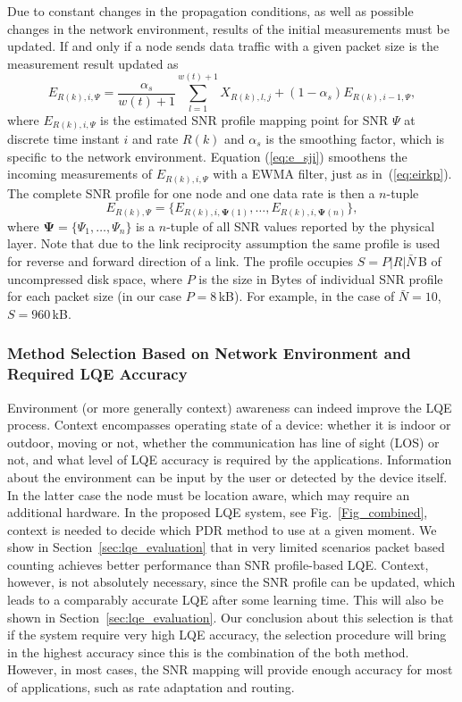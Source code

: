 \documentclass[11pt,draftclsnofoot,journal,onecolumn]{IEEEtran}
\begin{document}
Due to constant changes in the propagation conditions, as well as possible changes in the network environment, results of the initial measurements must be updated. If and only if a node sends data traffic with a given packet size is the measurement result updated as
\begin{equation}
E_{R(k),i,\Psi}=\frac{\alpha_s}{w(t)+1}\sum_{l=1}^{w(t)+1}X_{R(k),l,j}+(1-\alpha_s)E_{R(k),i-1,\Psi},
\label{eq:e_sji}
\end{equation}
where $E_{R(k),i,\Psi}$ is the estimated SNR profile mapping point for SNR $\Psi$ at discrete time instant $i$ and rate $R(k)$ and $\alpha_s$ is the smoothing factor, which is specific to the network environment. Equation (\ref{eq:e_sji}) smoothens the incoming measurements of $E_{R(k),i,\Psi}$ with a EWMA filter, just as in~(\ref{eq:eirkp}). The complete SNR profile for one node and one data rate is then a $n$-tuple
\begin{equation}
E_{R(k),\Psi}=\{E_{R(k),i,\mathbf\Psi(1)},\ldots,E_{R(k),i,\mathbf\Psi(n)}\},
\label{eq:eirks}
\end{equation}
where $\mathbf\Psi=\{\Psi_1,\ldots,\Psi_n\}$ is a $n$-tuple of all SNR values reported by the physical layer. Note that due to the link reciprocity assumption the same profile is used for reverse and forward direction of a link. The profile occupies $S=P|R|\bar{N}$\,B of uncompressed disk space, where $P$ is the size in Bytes of individual SNR profile for each packet size (in our case $P=8$\,kB). For example, in the case of $\bar N=10$, $S=960$\,kB.

\subsubsection{Method Selection Based on Network Environment and Required LQE Accuracy}
\label{sec:context}

Environment (or more generally context) awareness can indeed improve the LQE process. Context encompasses operating state of a device: whether it is indoor or outdoor, moving or not, whether the communication has line of sight (LOS) or not, and what level of LQE accuracy is required by the applications. Information about the environment can be input by the user or detected by the device itself. In the latter case the node must be location aware, which may require an additional hardware. In the proposed LQE system, see Fig.~\ref{Fig_combined}, context is needed to decide which PDR method to use at a given moment. We show in Section~\ref{sec:lqe_evaluation} that in very limited scenarios packet based counting achieves better performance than SNR profile-based LQE. Context, however, is not absolutely necessary, since the SNR profile can be updated, which leads to a comparably accurate LQE after some learning time. This will also be shown in Section~\ref{sec:lqe_evaluation}. Our conclusion about this selection is that if the system require very high LQE accuracy, the selection procedure will bring in the highest accuracy since this is the combination of the both method. However, in most cases, the SNR mapping will provide enough accuracy for most of applications, such as rate adaptation and routing.
\end{document}
